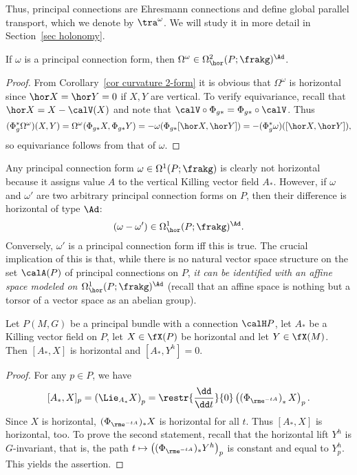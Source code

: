 Thus, principal connections are Ehresmann connections and define global parallel transport, which we denote by $\tra^\omega$. We will study it in more detail in Section~\ref{sec holonomy}.


\begin{cor}
    If $\omega$ is a principal connection form, then $\Omega^\omega\in \Omega^2_{\hor}(P;\frakg)^\Ad$.
\end{cor}
\begin{proof}
    From Corollary~\ref{cor curvature 2-form} it is obvious that $\Omega^\omega$ is horizontal since $\hor X=\hor Y=0$ if $X,Y$ are vertical. To verify equivariance, recall that $\hor X=X-\calV(X)$ and note that $\calV\circ \Phi_{g\ast}=\Phi_{g\ast}\circ \calV$. Thus 
    \[(\Phi_{g}^\ast\Omega^\omega)(X,Y)=\Omega^\omega(\Phi_{g\ast}X,\Phi_{g\ast}Y)=-\omega(\Phi_{g\ast}[\hor X,\hor Y])=-(\Phi_{g}^\ast\omega)([\hor X,\hor Y]),\]
    so equivariance follows from that of $\omega$.
\end{proof}


\begin{rem}
    Any principal connection form $\omega\in\Omega^1(P;\frakg)$ is clearly not horizontal because it assigns value $A$ to the vertical Killing vector field $A_\ast$. 
    However, if $\omega$ and $\omega'$ are two arbitrary principal connection forms on $P$, then their difference is horizontal of type $\Ad$:
    \[(\omega-\omega')\in \Omega^1_{\hor}(P;\frakg)^\Ad.\]
    Conversely, $\omega'$ is a principal connection form iff this is true. The crucial implication of this is that, while there is no natural vector space structure on the set $\calA(P)$ of principal connections on $P$, \emph{it can be identified with an affine space modeled on $\Omega^1_{\hor}(P;\frakg)^\Ad$} (recall that an affine space is nothing but a torsor of a vector space as an abelian group).
\end{rem}


\begin{lem}[{{\cite[Lem.~1.4.2]{RS2}}}]\label{lem 1.4.2 RS2}
    Let $P(M,G)$ be a principal bundle with a connection $\calH P$, let $A_\ast$ be a Killing vector field on $P$, let $X\in\fX(P)$ be horizontal and let $Y\in \fX(M)$. Then $[A_\ast,X]$ is horizontal and $[A_\ast,Y^h]=0$.
\end{lem}
\begin{proof}
    For any $p\in P$, we have
    \[[A_\ast,X]_p=\left(\Lie_{A_\ast}X\right)_p=\restr{\frac{\dd}{\dd t}}{0} \left(\left(\Phi_{\rme^{-tA}}\right)_\ast X\right)_p.\]
    Since $X$ is horizontal, $(\Phi_{\rme^{-tA}})_\ast X$ is horizontal for all $t$. Thus $[A_\ast,X]$ is horizontal, too. To prove the second statement, recall that the horizontal lift $Y^h$ is $G$-invariant, that is, the path $t\mapsto \left((\Phi_{\rme^{-tA}})_\ast Y^h\right)_p$ is constant and equal to $Y^h_p$. This yields the assertion.
\end{proof}


